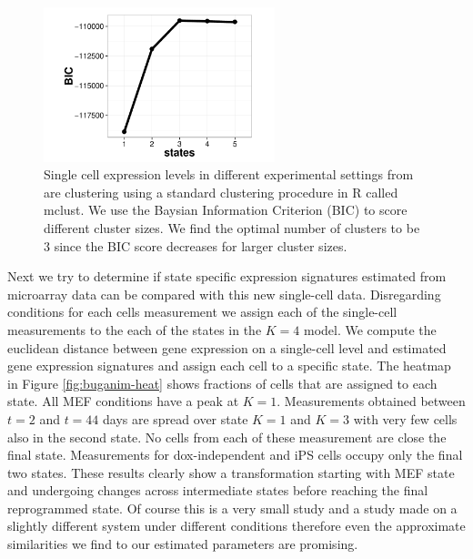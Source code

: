\begin{figure}[!t]
  \centering
  \includegraphics[width=0.6\textwidth]{pics/yossi_mclust.pdf}
  \caption{Single cell expression levels in different experimental settings from \cite{Buganim:2012hp} are clustering using a standard clustering procedure in R called mclust. We use the Baysian Information Criterion (BIC) to score different cluster sizes. We find the optimal number of clusters to be $3$ since the BIC score decreases for larger cluster sizes.}
  \label{fig:buganim-mclust}
\end{figure}

Next we try to determine if state specific expression signatures estimated from microarray data can be compared with this new single-cell data. Disregarding conditions for each cells measurement we assign each of the single-cell measurements to the each of the states in the $K=4$ model. We compute the euclidean distance between gene expression on a single-cell level and estimated gene expression signatures and assign each cell to a specific state. The heatmap in Figure \ref{fig:buganim-heat} shows fractions of cells that are assigned to each state. All MEF conditions have a peak at $K=1$. Measurements obtained between $t=2$ and $t=44$ days are spread over state $K=1$ and $K=3$ with very few cells also in the second state. No cells from each of these measurement are close the final state. Measurements for dox-independent and iPS cells occupy only the final two states. These results clearly show a transformation starting with MEF state and undergoing changes across intermediate states before reaching the final reprogrammed state. Of course this is a very small study and a study made on a slightly different system under different conditions therefore even the approximate similarities we find to our estimated parameters are promising. 

